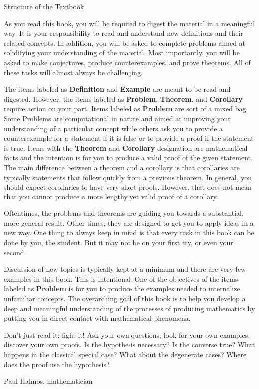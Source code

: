 \begin{section}{Structure of the Textbook}\label{sec:Structure}

As you read this book, you will be required to digest the material in a meaningful way.  It is your responsibility to read and understand new definitions and their related concepts.  In addition, you will be asked to complete problems aimed at solidifying your understanding of the material.  Most importantly, you will be asked to make conjectures, produce counterexamples, and prove theorems. All of these tasks will almost always be challenging.

The items labeled as \textbf{Definition} and \textbf{Example} are meant to be read and digested.  However, the items labeled as \textbf{Problem}, \textbf{Theorem}, and \textbf{Corollary} require action on your part.  Items labeled as \textbf{Problem} are sort of a mixed bag. Some Problems are computational in nature and aimed at improving your understanding of a particular concept while others ask you to provide a counterexample for a statement if it is false or to provide a proof if the statement is true. Items with the \textbf{Theorem} and \textbf{Corollary} designation are mathematical facts and the intention is for you to produce a valid proof of the given statement. The main difference between a theorem and a corollary is that corollaries are typically statements that follow quickly from a previous theorem.  In general, you should expect corollaries to have very short proofs.  However, that does not mean that you cannot produce a more lengthy yet valid proof of a corollary.

Oftentimes, the problems and theorems are guiding you towards a substantial, more  general result. Other times, they are designed to get you to apply ideas in a new way. One thing to always keep in mind is that every task in this book can be done by you, the student. But it may not be on your first try, or even your second.

Discussion of new topics is typically kept at a minimum and there are very few examples in this book. This is intentional.  One of the objectives of the items labeled as \textbf{Problem} is for you to produce the examples needed to internalize unfamiliar concepts.  The overarching goal of this book is to help you develop a deep and meaningful understanding of the processes of producing mathematics by putting you in direct contact with mathematical phenomena.

\epigraph{Don't just read it; fight it! Ask your own questions, look for your own examples, discover your own proofs. Is the hypothesis necessary? Is the converse true? What happens in the classical special case? What about the degenerate cases? Where does the proof use the hypothesis?}{Paul Halmos, mathematician}

\end{section}

